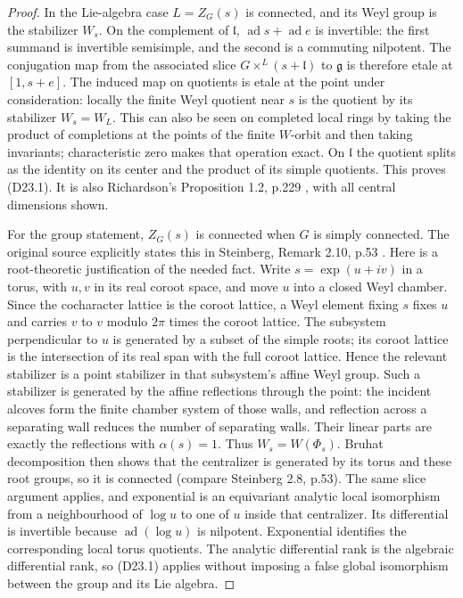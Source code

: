 \begin{proof}
In the Lie-algebra case $L=Z_G(s)$ is connected, and its Weyl group
is the stabilizer $W_s$.  On the complement of $\mathfrak l$,
$\operatorname{ad}s+\operatorname{ad}e$ is invertible: the first
summand is invertible semisimple, and the second is a commuting
nilpotent.  The conjugation map from the associated slice
$G\times^L(s+\mathfrak l)$ to $\mathfrak g$ is therefore etale
at $[1,s+e]$.  The induced map on quotients is etale at the point
under consideration: locally the finite Weyl quotient near $s$
is the quotient by its stabilizer $W_s=W_L$.
This can also be seen on completed local rings by taking the
product of completions at the points of the finite $W$-orbit
and then taking invariants; characteristic zero makes that
operation exact.  On $\mathfrak l$ the quotient splits as the
identity on its center and the product of its simple quotients.
This proves (D23.1).  It is also Richardson's Proposition 1.2,
p.229 \cite{D-Richardson1987}, with all central dimensions shown.

For the group statement, $Z_G(s)$ is connected when $G$ is simply
connected.  The original source explicitly states this in
Steinberg, Remark 2.10, p.53 \cite{D-Steinberg1965}.
Here is a root-theoretic justification of the needed fact.  Write
$s=\exp(u+iv)$ in a torus, with $u,v$ in its real coroot space,
and move $u$ into a closed Weyl chamber.  Since the cocharacter
lattice is the coroot lattice, a Weyl element fixing $s$ fixes $u$
and carries $v$ to $v$ modulo $2\pi$ times the coroot lattice.
The subsystem perpendicular to $u$ is generated by a subset of
the simple roots; its coroot lattice is the intersection of its
real span with the full coroot lattice.  Hence the relevant
stabilizer is a point stabilizer in that subsystem's affine
Weyl group.  Such a stabilizer is generated by the affine
reflections through the point: the incident alcoves form the
finite chamber system of those walls, and reflection across
a separating wall reduces the number of separating walls.
Their linear parts are exactly the reflections with
$\alpha(s)=1$.  Thus $W_s=W(\Phi_s)$.  Bruhat decomposition
then shows that the centralizer is generated by its torus and
these root groups, so it is connected (compare Steinberg 2.8,
p.53).  The same slice argument applies, and exponential
is an equivariant analytic local isomorphism from a neighbourhood
of $\log u$ to one of $u$ inside that centralizer.  Its differential
is invertible because $\operatorname{ad}(\log u)$ is nilpotent.
Exponential identifies the corresponding local torus quotients.
The analytic differential rank is the algebraic differential rank,
so (D23.1) applies without imposing a false global isomorphism
between the group and its Lie algebra.
\end{proof}

